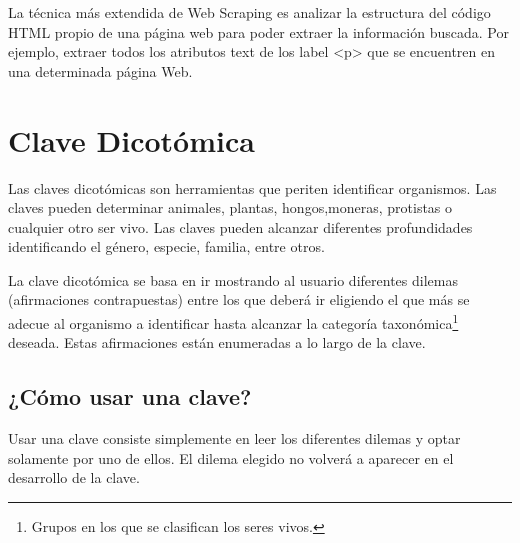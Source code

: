 La técnica más extendida de Web Scraping es analizar la estructura del código HTML propio de una página web para poder extraer la información buscada. Por ejemplo, extraer todos los atributos text de los label <p> que se encuentren en una determinada página Web.


\section{Clave Dicotómica}

Las claves dicotómicas son herramientas que periten identificar organismos. Las claves pueden determinar animales, plantas, hongos,moneras, protistas o cualquier otro ser vivo. Las claves pueden alcanzar diferentes profundidades identificando el género, especie, familia, entre otros.

La clave dicotómica se basa en ir mostrando al usuario diferentes dilemas (afirmaciones contrapuestas) entre los que deberá ir eligiendo el que más se adecue al organismo a identificar hasta alcanzar la categoría taxonómica\footnote{Grupos en los que se clasifican los seres vivos.} deseada. Estas afirmaciones están enumeradas a lo largo de la clave.

\subsection{¿Cómo usar una clave?}

Usar una clave consiste simplemente en leer los diferentes dilemas y optar solamente por uno de ellos. El dilema elegido no volverá a aparecer en el desarrollo de la clave.
\cite{claveDicotomica}


































































